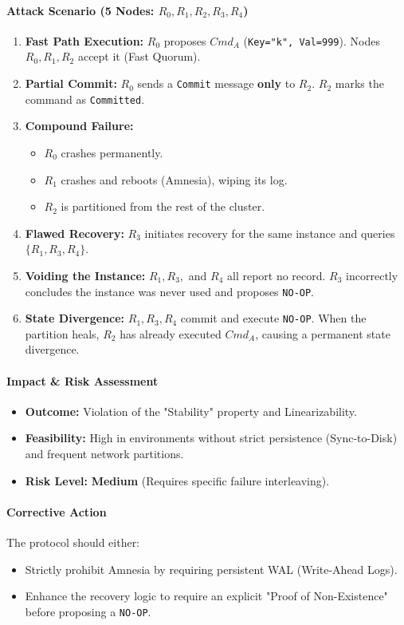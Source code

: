 \documentclass{article}
\theoremstyle{plain}
\theoremstyle{definition}
\theoremstyle{remark}
\begin{document}
{\paragraph{Attack Scenario (5 Nodes: $R_0, R_1, R_2, R_3, R_4$)}
\begin{enumerate}
    \item \textbf{Fast Path Execution:} $R_0$ proposes $Cmd_A$ (\texttt{Key="k", Val=999}). Nodes $R_0, R_1, R_2$ accept it (Fast Quorum).
    \item \textbf{Partial Commit:} $R_0$ sends a \texttt{Commit} message \textbf{only} to $R_2$. $R_2$ marks the command as \texttt{Committed}.
    \item \textbf{Compound Failure:} 
        \begin{itemize}
            \item $R_0$ crashes permanently.
            \item $R_1$ crashes and reboots (Amnesia), wiping its log.
            \item $R_2$ is partitioned from the rest of the cluster.
        \end{itemize}
    \item \textbf{Flawed Recovery:} $R_3$ initiates recovery for the same instance and queries $\{R_1, R_3, R_4\}$. 
    \item \textbf{Voiding the Instance:} $R_1, R_3,$ and $R_4$ all report no record. $R_3$ incorrectly concludes the instance was never used and proposes \texttt{NO-OP}.
    \item \textbf{State Divergence:} $R_1, R_3, R_4$ commit and execute \texttt{NO-OP}. When the partition heals, $R_2$ has already executed $Cmd_A$, causing a permanent state divergence.
\end{enumerate}

\paragraph{Impact \& Risk Assessment}
\begin{itemize}
    \item \textbf{Outcome:} Violation of the "Stability" property and Linearizability.
    \item \textbf{Feasibility:} High in environments without strict persistence (Sync-to-Disk) and frequent network partitions.
    \item \textbf{Risk Level:} \textbf{Medium} (Requires specific failure interleaving).
\end{itemize}

\paragraph{Corrective Action}
The protocol should either:
\begin{itemize}
    \item Strictly prohibit Amnesia by requiring persistent WAL (Write-Ahead Logs).
    \item Enhance the recovery logic to require an explicit "Proof of Non-Existence" before proposing a \texttt{NO-OP}.
\end{itemize}
}
\end{document}
